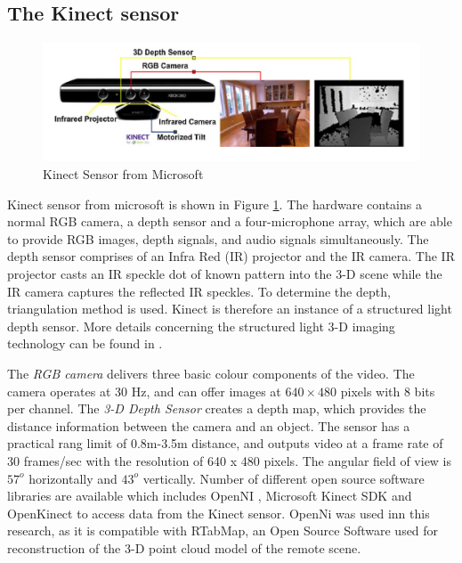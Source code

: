 \subsection{The Kinect sensor }
\begin{figure}
	\includegraphics[width=\linewidth,keepaspectratio]{Chapter7/fig/Kinect}
	\caption{Kinect Sensor from Microsoft}	\label{fig:Kinect}
\end{figure}
Kinect sensor from microsoft is shown in Figure \ref{fig:Kinect}. The hardware contains a normal RGB camera, a depth sensor and a four-microphone array, which are able to provide  RGB images,  depth signals, and audio signals simultaneously. The depth sensor comprises of an Infra Red (IR) projector and the IR camera. The IR projector casts an IR speckle dot of known  pattern into the 3-D scene while the IR camera captures the reflected IR speckles. To determine the depth, triangulation method is used.  Kinect is therefore an instance of a structured light depth sensor. More details concerning the structured light 3-D imaging technology can be found in \cite{geng2011structured}. 

The \textit{RGB camera}  delivers three basic colour components of the video. The camera operates at 30 Hz, and can offer images at $640\times480$ pixels with 8 bits per channel. The  \textit{3-D Depth Sensor} creates a depth map, which provides the distance information between the camera and an object. The sensor has a practical rang limit of 0.8m-3.5m distance, and outputs video at a frame rate of 30 frames/sec with the resolution of 640 x 480 pixels. The angular field of view is $57^o$ horizontally and $43^o$ vertically.
Number of different open source software libraries are available  which includes OpenNI \cite{openni}, Microsoft Kinect SDK  \cite{mssdk} and OpenKinect \cite{freenect} to access data from the Kinect sensor. OpenNi was used inn this research, as it is compatible with RTabMap, an Open Source Software used for reconstruction of the 3-D point cloud model of the  remote scene. 

